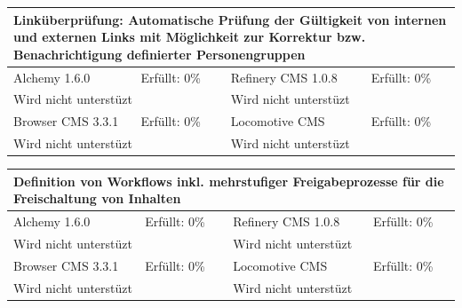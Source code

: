 \begin{tabular}[!ht]{|l|l|l|l|}
\hline
\multicolumn{4}{|p{15cm}|}{\textbf{Linküberprüfung: Automatische Prüfung der Gültigkeit von internen und externen Links mit Möglichkeit zur Korrektur bzw. Benachrichtigung definierter
Personengruppen}} \\
\hline
  Alchemy 1.6.0 & \cellcolor{red}Erfüllt: 0\% & Refinery CMS 1.0.8 & \cellcolor{red}Erfüllt: 0\% \\
  \hline
  \multicolumn{2}{|p{7.5cm}|}{Wird nicht unterstüzt} & \multicolumn{2}{p{7.5cm}|}{Wird nicht unterstüzt} \\
  \hline
  Browser CMS 3.3.1 & \cellcolor{red}Erfüllt: 0\% & Locomotive CMS & \cellcolor{red}Erfüllt: 0\% \\
  \hline
  \multicolumn{2}{|p{7.5cm}|}{Wird nicht unterstüzt} & \multicolumn{2}{p{7.5cm}|}{Wird nicht unterstüzt} \\
\hline
\end{tabular}
\newline
\newline
\newline
\begin{tabular}[!ht]{|l|l|l|l|}
\hline
\multicolumn{4}{|p{15cm}|}{\textbf{Definition von Workflows inkl. mehrstufiger Freigabeprozesse für die Freischaltung von Inhalten}} \\
\hline
  Alchemy 1.6.0 & \cellcolor{red}Erfüllt: 0\% & Refinery CMS 1.0.8 & \cellcolor{red}Erfüllt: 0\% \\
  \hline
  \multicolumn{2}{|p{7.5cm}|}{Wird nicht unterstüzt} & \multicolumn{2}{p{7.5cm}|}{Wird nicht unterstüzt} \\
  \hline
  Browser CMS 3.3.1 & \cellcolor{red}Erfüllt: 0\% & Locomotive CMS & \cellcolor{red}Erfüllt: 0\% \\
  \hline
  \multicolumn{2}{|p{7.5cm}|}{Wird nicht unterstüzt} & \multicolumn{2}{p{7.5cm}|}{Wird nicht unterstüzt} \\
\hline
\end{tabular}
\newline
\newline
\newline
